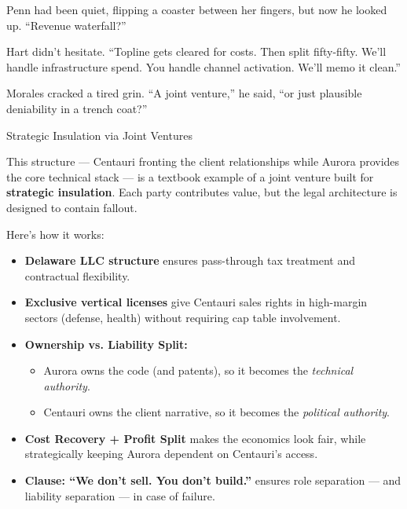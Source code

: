 Penn had been quiet, flipping a coaster between her fingers, but now he looked up. ``Revenue waterfall?''

Hart didn’t hesitate. ``Topline gets cleared for costs. Then split fifty-fifty. We’ll handle infrastructure spend. You 
handle channel activation. We’ll memo it clean.''

Morales cracked a tired grin. ``A joint venture,'' he said, ``or just plausible deniability in a trench coat?''


\medskip

\begin{TechnicalSidebar}{Strategic Insulation via Joint Ventures}

  This structure — Centauri fronting the client relationships while Aurora provides the core technical stack — is a 
  textbook example of a joint venture built for \textbf{strategic insulation}. Each party contributes value, but the 
  legal architecture is designed to contain fallout.
  
  \medskip
  
  Here’s how it works:

  \medskip
  
  \begin{itemize}
    \item \textbf{Delaware LLC structure} ensures pass-through tax treatment and contractual flexibility.
    \item \textbf{Exclusive vertical licenses} give Centauri sales rights in high-margin sectors (defense, health) without 
    requiring cap table involvement.
    \item \textbf{Ownership vs. Liability Split:}
      \begin{itemize}
        \item Aurora owns the code (and patents), so it becomes the \textit{technical authority}.
        \item Centauri owns the client narrative, so it becomes the \textit{political authority}.
      \end{itemize}
    \item \textbf{Cost Recovery + Profit Split} makes the economics look fair, while strategically keeping Aurora dependent 
    on Centauri’s access.
    \item \textbf{Clause: “We don’t sell. You don’t build.”} ensures role separation — and liability separation — in case 
    of failure.
  \end{itemize}
  
  \medskip
  

\end{TechnicalSidebar}
